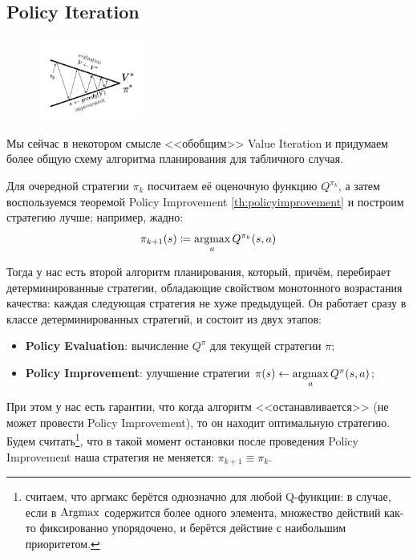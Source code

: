 


\subsection{Policy Iteration}

\begin{figure}
\vspace{-1cm}
\centering
\includegraphics[width=0.3\textwidth]{Images/PI_basic.png}
\vspace{-1cm}
\end{figure}

Мы сейчас в некотором смысле <<обобщим>> Value Iteration и придумаем более общую схему алгоритма планирования для табличного случая.

Для очередной стратегии $\pi_k$ посчитаем её оценочную функцию $Q^{\pi_k}$, а затем воспользуемся теоремой Policy Improvement \ref{th:policyimprovement} и построим стратегию лучше; например, жадно:
$$\pi_{k+1}(s) \coloneqq \mathop{\mathrm{argmax}}\limits_{a} Q^{\pi_k}(s, a)$$

Тогда у нас есть второй алгоритм планирования, который, причём, перебирает детерминированные стратегии, обладающие свойством монотонного возрастания качества: каждая следующая стратегия не хуже предыдущей. Он работает сразу в классе детерминированных стратегий, и состоит из двух этапов:
\begin{itemize}
    \item \textbf{Policy Evaluation}: вычисление $Q^\pi$ для текущей стратегии $\pi$;
    \item \textbf{Policy Improvement}: улучшение стратегии $\pi(s) \leftarrow \mathop{\mathrm{argmax}}\limits_a Q^\pi(s, a)$;
\end{itemize}

При этом у нас есть гарантии, что когда алгоритм <<останавливается>> (не может провести Policy Improvement), то он находит оптимальную стратегию. Будем считать\footnote{считаем, что аргмакс берётся однозначно для любой Q-функции: в случае, если в $\mathop{\mathrm{Argmax}}$ содержится более одного элемента, множество действий как-то фиксированно упорядочено, и берётся действие с наибольшим приоритетом.}, что в такой момент остановки после проведения Policy Improvement наша стратегия не меняется: $\pi_{k+1} \equiv \pi_k$.

